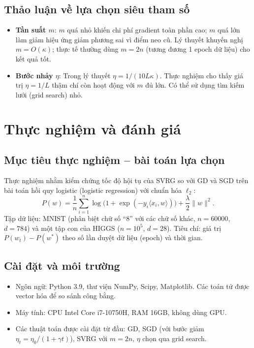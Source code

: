 \documentclass[12pt,a4paper]{report}
\theoremstyle{definition}
\begin{document}
\section{Thảo luận về lựa chọn siêu tham số}
\begin{itemize}
    \item \textbf{Tần suất $m$}: $m$ quá nhỏ khiến chi phí gradient toàn phần cao; $m$ quá lớn làm giảm hiệu ứng giảm phương sai vì điểm neo cũ. Lý thuyết khuyến nghị $m = O(\kappa)$; thực tế thường dùng $m = 2n$ (tương đương 1 epoch dữ liệu) cho kết quả tốt.
    \item \textbf{Bước nhảy $\eta$}: Trong lý thuyết $\eta = 1/(10 L \kappa)$. Thực nghiệm cho thấy giá trị $\eta = 1/L$ thậm chí còn hoạt động với $m$ đủ lớn. Có thể sử dụng tìm kiếm lưới (grid search) nhỏ.
\end{itemize}

\chapter{Thực nghiệm và đánh giá}

\section{Mục tiêu thực nghiệm -- bài toán lựa chọn}
Thực nghiệm nhằm kiểm chứng tốc độ hội tụ của SVRG so với GD và SGD trên bài toán hồi quy logistic (logistic regression) với chuẩn hóa $\ell_2$:
\begin{equation}
P(w) = \frac{1}{n}\sum_{i=1}^{n} \log\big(1 + \exp(-y_i \langle x_i, w\rangle)\big) + \frac{\lambda}{2}\|w\|^2.
\end{equation}
Tập dữ liệu: MNIST (phân biệt chữ số “8” với các chữ số khác, $n=60000$, $d=784$) và một tập con của HIGGS ($n=10^5$, $d=28$). Tiêu chí: giá trị $P(w_t)-P(w^*)$ theo số lần duyệt dữ liệu (epoch) và thời gian.

\section{Cài đặt và môi trường}
\begin{itemize}
    \item Ngôn ngữ: Python 3.9, thư viện NumPy, Scipy, Matplotlib. Các toán tử được vector hóa để so sánh công bằng.
    \item Máy tính: CPU Intel Core i7-10750H, RAM 16GB, không dùng GPU.
    \item Các thuật toán được cài đặt từ đầu: GD, SGD (với bước giảm $\eta_t = \eta_0/(1 + \gamma t)$), SVRG với $m = 2n$, $\eta$ chọn qua grid search.
\end{itemize}
\end{document}
